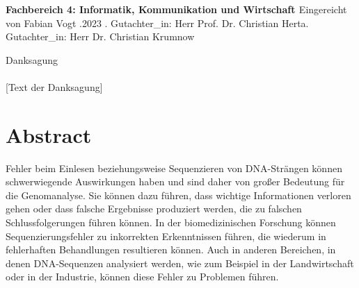 \documentclass[oneside,bibliography=totocnumbered,BCOR=5mm]{scrbook}%
\theoremstyle{definition}
\theoremstyle{definition}
\theoremstyle{definition}
\theoremstyle{definition}
\theoremstyle{definition}
\theoremstyle{definition}
\begin{document}
\begin{titlepage}
\begin{center}
\linebreak[4]
\textbf{\large{\color{HTW_green} Fachbereich 4: Informatik, Kommunikation und Wirtschaft }}
\linebreak[4]
\linebreak[4]
\linebreak[4]
\linebreak[4]
Eingereicht von Fabian Vogt
\linebreak[4]
.2023
\linebreak[4]
\linebreak[4]
\linebreak[4]
. Gutachter\_in: Herr Prof. Dr. Christian Herta. Gutachter\_in: Herr Dr. Christian Krumnow\linebreak[4]
\linebreak[4]

\end{center}
\end{titlepage}
\newpage    %

\thispagestyle{empty}       %
\vspace*{2.2cm}
\noindent %
{\Huge Danksagung}\\
\vspace*{1.6cm} \\

[Text der Danksagung]

\newpage
\thispagestyle{empty}    

\section*{Abstract}
Fehler beim Einlesen beziehungsweise Sequenzieren von DNA-Strängen können schwerwiegende Auswirkungen haben und sind daher von großer Bedeutung für die Genomanalyse. 
Sie können dazu führen, dass wichtige Informationen verloren gehen oder dass falsche Ergebnisse produziert werden, die zu falschen Schlussfolgerungen führen können. 
In der biomedizinischen Forschung können Sequenzierungsfehler zu inkorrekten Erkenntnissen führen, die wiederum in fehlerhaften Behandlungen resultieren können. 
Auch in anderen Bereichen, in denen DNA-Sequenzen analysiert werden, wie zum Beispiel in der Landwirtschaft oder in der Industrie, 
können diese Fehler zu Problemen führen.\\
\end{document}
